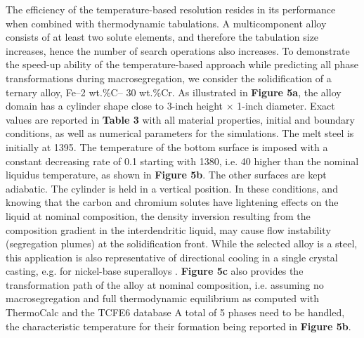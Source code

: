 
The efficiency of the temperature-based resolution resides in its performance when combined with 
thermodynamic tabulations. A multicomponent alloy consists of at least two solute elements, and 
therefore the tabulation size increases, hence the number of search operations also increases. 
To demonstrate the speed-up ability of the temperature-based approach while predicting all phase 
transformations during macrosegregation, we consider the solidification of a ternary alloy, Fe–2 wt.\%C– 30 wt.\%Cr. 
As illustrated in \textbf{Figure 5a}, the alloy domain has a cylinder shape close to 3-inch height × 1-inch diameter. 
Exact values are reported in \textbf{Table 3} with all material properties, initial and boundary conditions, 
as well as numerical parameters for the simulations. The melt steel is initially at \SI{1395}{\udegC}. The 
temperature of the bottom surface is imposed with a constant decreasing rate of \SI{0.1}{\uCR} starting 
with \SI{1380}{\udegC}, i.e. \SI{40}{\udegC} higher than the nominal liquidus temperature, as shown 
in \textbf{Figure 5b}. The other surfaces are kept adiabatic. The cylinder is held in a vertical position. 
In these conditions, and knowing that the carbon and chromium solutes have lightening effects on the liquid 
at nominal composition, the density inversion resulting from the composition gradient in the interdendritic 
liquid, may cause flow instability (segregation plumes) at the solidification front. While the selected alloy 
is a steel, this application is also representative of directional cooling in a single crystal casting, e.g. 
for nickel-base superalloys \citep{beckermann_development_2000}. \textbf{Figure 5c} also provides the 
transformation path of the alloy at nominal composition, i.e. assuming no macrosegregation and full 
thermodynamic equilibrium as computed with ThermoCalc and the TCFE6 database %
A total of 5 phases need to be handled, the characteristic temperature for their formation being reported 
in \textbf{Figure 5b}. %
 
